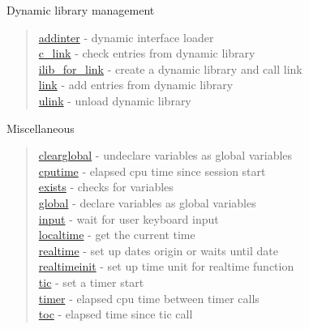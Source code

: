 Dynamic library management
\begin{quote}
\noindent
\hyperlink{addinter}{addinter} - dynamic interface loader\\
\hyperlink{c_link}{c\_link} - check entries from dynamic library \\
\hyperlink{ilib_for_link}{ilib\_for\_link} - create a dynamic library and call link \\
\hyperlink{link}{link} - add entries from dynamic library \\
\hyperlink{ulink}{ulink} - unload dynamic library \\
\end{quote}

Miscellaneous
\begin{quote}
\noindent
\hyperlink{clearglobal}{clearglobal} - {undeclare variables as global variables} \\
\hyperlink{cputime}{cputime} - {elapsed cpu time since session start} \\
\hyperlink{exists}{exists} - {checks for variables}\\
\hyperlink{global}{global} - {declare variables as global variables} \\
\hyperlink{input}{input} - {wait for user keyboard input} \\
\hyperlink{localtime}{localtime} - {get the current time}\\
\hyperlink{realtime}{realtime} - set up dates origin or waits until date \\
\hyperlink{realtimeinit}{realtimeinit} - set up time unit for realtime function \\
\hyperlink{tic}{tic} - {set a timer start}\\
\hyperlink{timer}{timer} - {elapsed cpu time between timer calls} \\
\hyperlink{toc}{toc} - {elapsed time since tic call}\\
\end{quote}






















